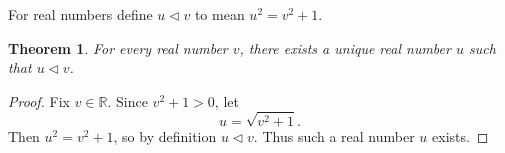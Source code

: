 \documentclass{article}
\newtheorem{theorem}{Theorem}
\begin{document}
For real numbers define $u \triangleleft v$ to mean $u^2=v^2+1$.

\begin{theorem}\label{thm:lift}
For every real number $v$, there exists a unique real number $u$
such that $u\triangleleft v$.
\end{theorem}

\begin{proof}
Fix $v\in\mathbb R$. Since $v^2+1>0$, let
\[
u=\sqrt{v^2+1}.
\]
Then $u^2=v^2+1$, so by definition $u\triangleleft v$.
Thus such a real number $u$ exists.
\end{proof}
\end{document}

